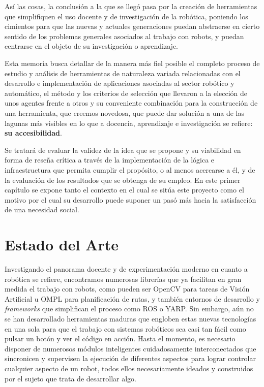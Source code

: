 Así las cosas, la conclusión a la que se llegó pasa por la creación de herramientas que simplifiquen el uso docente y de investigación de la robótica, poniendo los cimientos para que las nuevas y actuales generaciones puedan abstraerse en cierto sentido de los problemas generales asociados al trabajo con robots, y puedan centrarse en el objeto de su investigación o aprendizaje.

Esta memoria busca detallar de la manera más fiel posible el completo proceso de estudio y análisis de herramientas de naturaleza variada relacionadas con el desarrollo e implementación de aplicaciones asociadas al sector robótico y automático, el método y los criterios de selección que llevaron a la elección de unos agentes frente a otros y su conveniente combinación para la construcción de una herramienta, que creemos novedosa, que puede dar solución a una de las lagunas más visibles en lo que a docencia, aprendizaje e investigación se refiere: {\bf{su accesibilidad}}.

Se tratará de evaluar la validez de la idea que se propone y su viabilidad en forma de reseña crítica a través de la implementación de la lógica e infraestructura que permita cumplir el propósito, o al menos acercarse a él, y de la evaluación de los resultados que se obtenga de su empleo. En este primer capítulo se expone tanto el contexto en el cual se sitúa este proyecto como el motivo por el cual su desarrollo puede suponer un pasó más hacia la satisfacción de una necesidad social.

\section{Estado del Arte}

Investigando el panorama docente y de experimentación moderno en cuanto a robótica se refiere, encontramos numerosas librerías que ya facilitan en gran medida el trabajo con robots, como pueden ser OpenCV para tareas de Visión Artificial u OMPL para planificación de rutas, y también entornos de desarrollo y \textit{frameworks} que simplifican el proceso como ROS o YARP. 
Sin embargo, aún no se han desarrollado herramientas maduras que engloben estas nuevas tecnologías en una sola para que el trabajo con sistemas robóticos sea casi tan fácil como pulsar un botón y ver el código en acción. Hasta el momento, es necesario disponer de numerosos módulos inteligentes cuidadosamente interconectados que sincronicen y supervisen la ejecución de diferentes aspectos para lograr controlar cualquier aspecto de un robot, todos ellos necesariamente ideados y construidos por el sujeto que trata de desarrollar algo.

